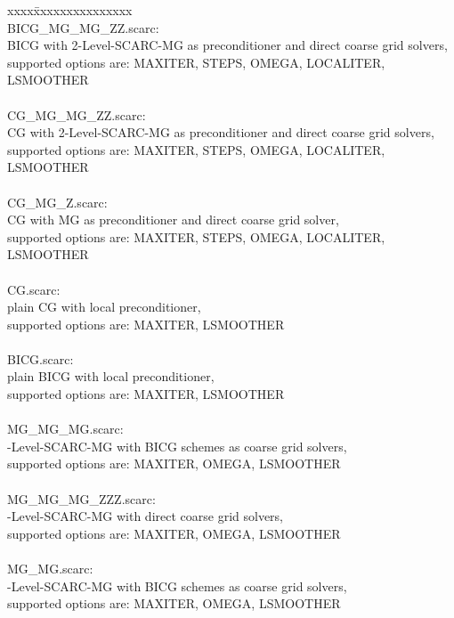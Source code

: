 \begin{tabbing}
xxxx\=  xxxxxxxxxxxxxxx \kill \\
BICG\_MG\_MG\_ZZ.scarc:\\
\> BICG with 2-Level-SCARC-MG as preconditioner and direct coarse grid solvers,\\
\>  supported options are: MAXITER, STEPS, OMEGA, LOCALITER, LSMOOTHER\\
\\

CG\_MG\_MG\_ZZ.scarc:\\
\> CG with 2-Level-SCARC-MG as preconditioner and direct coarse grid solvers,\\
\> supported options are: MAXITER, STEPS, OMEGA, LOCALITER, LSMOOTHER\\
\\

CG\_MG\_Z.scarc:\\
\> CG with MG as preconditioner and direct coarse grid solver,\\
\> supported options are: MAXITER, STEPS, OMEGA, LOCALITER, LSMOOTHER\\
\\

CG.scarc:\\
\> plain CG with local preconditioner,\\
\> supported options are: MAXITER, LSMOOTHER\\
\\

BICG.scarc:\\
\> plain BICG with local preconditioner,\\
\> supported options are: MAXITER, LSMOOTHER\\
\\

MG\_MG\_MG.scarc:\\
-Level-SCARC-MG with BICG schemes as coarse grid solvers,\\
\> supported options are: MAXITER, OMEGA, LSMOOTHER\\
\\

MG\_MG\_MG\_ZZZ.scarc:\\
-Level-SCARC-MG with direct coarse grid solvers,\\
\> supported options are: MAXITER, OMEGA, LSMOOTHER\\
\\

MG\_MG.scarc:\\
-Level-SCARC-MG with BICG schemes as coarse grid solvers,\\
\> supported options are: MAXITER, OMEGA, LSMOOTHER\\
\\


\end{tabbing}
